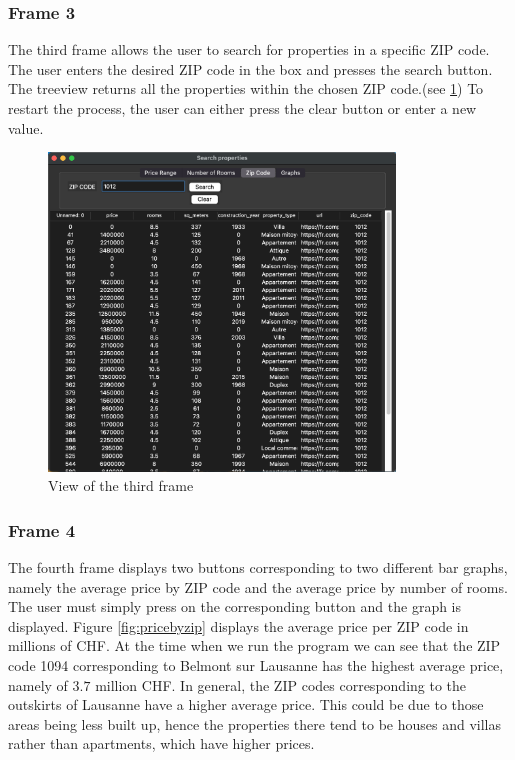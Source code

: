 \documentclass[main]{subfiles}
\begin{document}
\subsubsection{Frame 3}
The third frame allows the user to search for properties in a specific ZIP code. 
The user enters the desired ZIP code in the box and presses the search button. 
The treeview returns all the properties within the chosen ZIP code.(see \ref{fig:frame3})
To restart the process, the user can either press the clear button or enter a new value.

\begin{figure}[htbp]
    \centerline{
        \includegraphics[width = 92mm]{prog_10.png}}
    \caption{View of the third frame}
    \label{fig:frame3}
\end{figure}

\subsubsection{Frame 4}
The fourth frame displays two buttons corresponding to two different bar graphs, 
namely the average price by ZIP code and the average price by number of rooms.
The user must simply press on the corresponding button and the graph is displayed. 
Figure \ref{fig:pricebyzip} displays the average price per ZIP code in millions of CHF. 
At the time when we run the program we can see that the ZIP code 1094 corresponding to Belmont sur Lausanne has the highest average price, namely of $3.7$ million CHF.
In general, the ZIP codes corresponding to the outskirts of Lausanne have a higher average price. 
This could be due to those areas being less built up, hence the properties there tend to be houses and villas rather than apartments, which have higher prices. 
\end{document}
